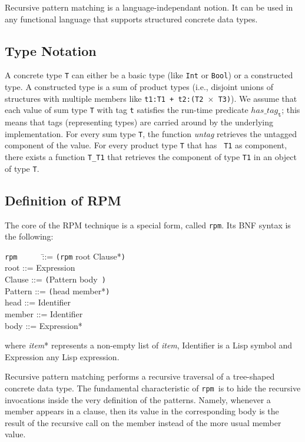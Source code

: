 \documentclass[a4paper,11pt]{article}
\newcommand{\rpm}{\texttt{rpm}}
\begin{document}
Recursive pattern matching is a language-independant notion. It can be
used in any functional language that supports structured concrete data
types. 

\subsection{Type Notation}

A concrete type \texttt{T} can either be a basic type (like \texttt{Int} or
\texttt{Bool}) or a constructed type. A constructed type is a sum of
product types (i.e., disjoint unions of structures with multiple
members like \texttt{t1:T1 + t2:(T2 $\times$ T3)}). We assume that each
value of sum type \texttt{T} with tag \texttt{t} satisfies the run-time
predicate $has\_tag_\texttt{t}$; this means that tags (representing
types) are carried around by the underlying implementation. For every
sum type \texttt{T}, the function \emph{untag} retrieves the untagged
component of the value.  For every product type \texttt{T} that has {\tt
T1} as component, there exists a function \texttt{T\_T1} that retrieves
the component of type \texttt{T1} in an object of type \texttt{T}.

\subsection{Definition of RPM}

The core of the RPM technique is a special form, called \rpm. Its
BNF syntax is the following:
\begin{tabbing}
\texttt{rpm}~~~~~~\=::= \texttt{(rpm} root Clause*\texttt{)} \\
root    \>::= Expression \\
Clause  \>::= \texttt{(}Pattern body\texttt{ )} \\
Pattern \>::= \texttt{(}head member*\texttt{)} \\
head    \>::= Identifier \\
member  \>::= Identifier \\
body    \>::= Expression*
\end{tabbing}
where \emph{item}* represents a non-empty list of \emph{item},
Identifier is a Lisp symbol and Expression any Lisp expression.

Recursive pattern matching performs a recursive traversal of a
tree-shaped concrete data type. The fundamental characteristic of
\rpm\ is to hide the recursive invocations inside the very definition
of the patterns. Namely, whenever a member appears in a clause, then
its value in the corresponding body is the result of the recursive
call on the member instead of the more usual member value.
\end{document}
